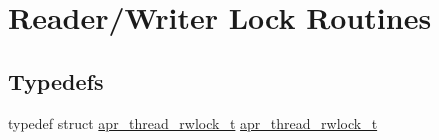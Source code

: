 \hypertarget{group__apr__thread__rwlock}{}\section{Reader/\+Writer Lock Routines}
\label{group__apr__thread__rwlock}
\subsection*{Typedefs}
\begin{DoxyCompactItemize}
\item 
typedef struct \hyperlink{group__apr__thread__rwlock_gaede9b908e3d9e6a8aed7bd10d0ae0498}{apr\+\_\+thread\+\_\+rwlock\+\_\+t} \hyperlink{group__apr__thread__rwlock_gaede9b908e3d9e6a8aed7bd10d0ae0498}{apr\+\_\+thread\+\_\+rwlock\+\_\+t}
\end{DoxyCompactItemize}
